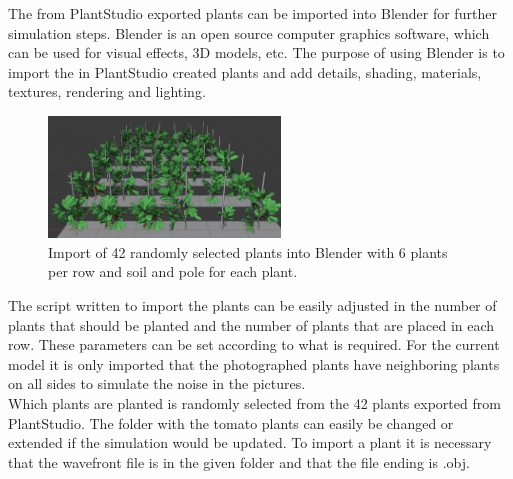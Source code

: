 The from PlantStudio exported plants can be imported into Blender for further simulation steps. Blender is an open source computer graphics software, which can be used for visual effects, 3D models, etc. The purpose of using Blender is to import the in PlantStudio created plants and  add details, shading, materials, textures, rendering and lighting. 

\begin{figure} 
	\vspace{-15pt}
	\begin{center}
		\includegraphics[width=0.55\textwidth]{BlenderImport.JPG}
		\caption{Import of 42 randomly selected plants into Blender with 6 plants per row and soil and pole for each plant.}
		\label{fig:BlenderImport}
	\end{center}
	\vspace{-20pt}
\end{figure} 

The script written to import the plants can be easily adjusted in the number of plants that should be planted and the number of plants that are placed in each row. These parameters can be set according to what is required. For the current model it is only imported that the photographed plants have neighboring plants on all sides to simulate the noise in the pictures.\\

Which plants are planted is randomly selected from the 42 plants exported from PlantStudio. The folder with the tomato plants can easily be changed or extended if the simulation would be updated. To import a plant it is necessary that the wavefront file is in the given folder and that the file ending is .obj. 

\vspace{5pt}

\vspace{5pt}

